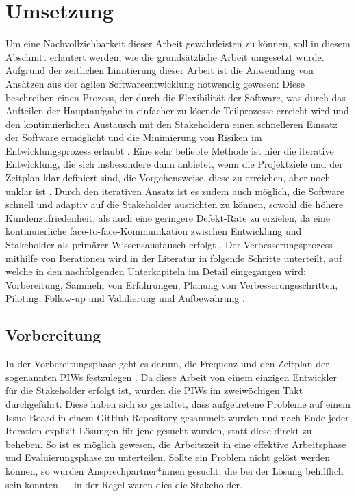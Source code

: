 \section{Umsetzung}
\label{sec:umsetzung}
Um eine Nachvollziehbarkeit dieser Arbeit gewährleisten zu können, soll in diesem Abschnitt erläutert werden, wie die grundsätzliche Arbeit umgesetzt wurde. \\
Aufgrund der zeitlichen Limitierung dieser Arbeit ist die Anwendung von Ansätzen aus der agilen Softwareentwicklung notwendig gewesen: Diese beschreiben einen Prozess, der durch die Flexibilität der Software, was durch das Aufteilen der Hauptaufgabe in einfacher zu lösende Teilprozesse erreicht wird und den kontinuierlichen Austausch mit den Stakeholdern einen schnelleren Einsatz der Software ermöglicht und die Minimierung von Risiken im Entwicklungsprozess erlaubt \cite{Siepermann2018}. Eine sehr beliebte Methode ist hier die iterative Entwicklung, die sich insbesondere dann anbietet, wenn die Projektziele und der Zeitplan klar definiert sind, die Vorgehensweise, diese zu erreichen, aber noch unklar ist \cite{salo2007iterative}. Durch den iterativen Ansatz ist es zudem auch möglich, die Software schnell und adaptiv auf die Stakeholder ausrichten zu können, sowohl die höhere Kundenzufriedenheit, als auch eine geringere Defekt-Rate zu erzielen, da eine kontinuierliche face-to-face-Kommunikation zwischen Entwicklung und Stakeholder als primärer Wissensaustausch erfolgt \cite{salo2007iterative}. Der Verbesserungsprozess mithilfe von Iterationen wird in der Literatur in folgende Schritte unterteilt, auf welche in den nachfolgenden Unterkapiteln im Detail eingegangen wird: Vorbereitung, Sammeln von Erfahrungen, Planung von Verbesserungsschritten, Piloting, Follow-up und Validierung und Aufbewahrung \cite{salo2007iterative}.

\subsection{Vorbereitung}
In der Vorbereitungsphase geht es darum, die Frequenz und den Zeitplan der sogenannten \ac{PIW}s festzulegen \cite{salo2007iterative}. Da diese Arbeit von einem einzigen Entwickler für die Stakeholder erfolgt ist, wurden die PIWs im zweiwöchigen Takt durchgeführt. Diese haben sich so gestaltet, dass aufgetretene Probleme auf einem Issue-Board in einem GitHub-Repository gesammelt wurden und nach Ende jeder Iteration explizit Lösungen für jene gesucht wurden, statt diese direkt zu beheben. So ist es möglich gewesen, die Arbeitszeit in eine effektive Arbeitsphase und Evaluierungsphase zu unterteilen. Sollte ein Problem nicht gelöst werden können, so wurden Ansprechpartner*innen gesucht, die bei der Lösung behilflich sein konnten --- in der Regel waren dies die Stakeholder.

